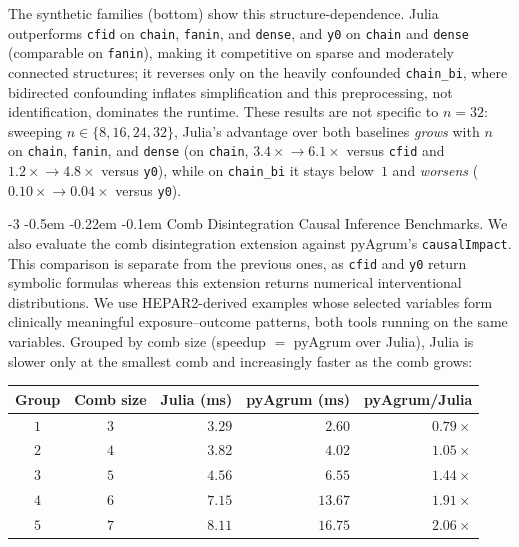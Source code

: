 \documentclass[runningheads]{llncs}
\makeatletter
\renewcommand\paragraph{\@startsection{paragraph}{4}{\z@}%
                       {-3\p@ \@plus -2\p@ \@minus -2\p@}%
                       {-0.5em \@plus -0.22em \@minus -0.1em}%
                       {\normalfont\normalsize\bfseries}}
\makeatother
\begin{document}
The synthetic families (bottom) show this structure-dependence. Julia outperforms \texttt{cfid} on \texttt{chain}, \texttt{fanin}, and \texttt{dense}, and \texttt{y0} on \texttt{chain} and \texttt{dense} (comparable on \texttt{fanin}), making it competitive on sparse and moderately connected structures; it reverses only on the heavily confounded \texttt{chain\_bi}, where bidirected confounding inflates simplification and this preprocessing, not identification, dominates the runtime. These results are not specific to $n=32$: sweeping $n\in\{8,16,24,32\}$, Julia's advantage over both baselines \emph{grows} with $n$ on \texttt{chain}, \texttt{fanin}, and \texttt{dense} (on \texttt{chain}, $3.4\times\!\to\!6.1\times$ versus \texttt{cfid} and $1.2\times\!\to\!4.8\times$ versus \texttt{y0}), while on \texttt{chain\_bi} it stays below~$1$ and \emph{worsens} ($0.10\times\!\to\!0.04\times$ versus \texttt{y0}).


\paragraph{Comb Disintegration Causal Inference Benchmarks.}
We also evaluate the comb disintegration extension against pyAgrum's \texttt{causalImpact}. This comparison is separate from the previous ones, as \texttt{cfid} and \texttt{y0} return symbolic formulas whereas this extension returns numerical interventional distributions. We use HEPAR2-derived examples whose selected variables form clinically meaningful exposure--outcome patterns, both tools running on the same variables. Grouped by comb size (speedup $=$ pyAgrum over Julia), Julia is slower only at the smallest comb and increasingly faster as the comb grows:

\begin{center}
\vspace{-0.8em}
\setlength{\tabcolsep}{8pt}
\begin{tabular}{ccrrr}
\toprule
Group & Comb size & Julia (ms) & pyAgrum (ms) & pyAgrum/Julia \\
\midrule
$1$ & $3$ & $3.29$ & $2.60$ & $0.79\times$ \\
$2$ & $4$ & $3.82$ & $4.02$ & $1.05\times$ \\
$3$ & $5$ & $4.56$ & $6.55$ & $1.44\times$ \\
$4$ & $6$ & $7.15$ & $13.67$ & $1.91\times$ \\
$5$ & $7$ & $8.11$ & $16.75$ & $2.06\times$ \\
\bottomrule
\end{tabular}
\vspace{-0.8em}
\end{center}
\end{document}
